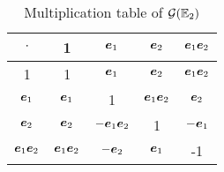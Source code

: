 \begin{table}[h!]
	\centering
	\begin{tabular}{|c|c|c|c|c|}
		\hline
		$\cdot$ & 1 & $\boldsymbol{e}_1$ & $\boldsymbol{e}_2$ & $\boldsymbol{e}_1\boldsymbol{e}_2$ \\
		\hline
		1 & 1 & $\boldsymbol{e}_1$ & $\boldsymbol{e}_2$ & $\boldsymbol{e}_1\boldsymbol{e}_2$ \\
		\hline
		$\boldsymbol{e}_1$ & $\boldsymbol{e}_1$ & 1 & $\boldsymbol{e}_1\boldsymbol{e}_2$ & $\boldsymbol{e}_2$ \\
		\hline
		$\boldsymbol{e}_2$ & $\boldsymbol{e}_2$ & $-\boldsymbol{e}_1\boldsymbol{e}_2$ & 1 & $-\boldsymbol{e}_1$ \\
		\hline
		$\boldsymbol{e}_1\boldsymbol{e}_2$ & $\boldsymbol{e}_1\boldsymbol{e}_2$ & $-\boldsymbol{e}_2$ & $\boldsymbol{e}_1$ & -1 \\
		\hline
	\end{tabular}
	\caption{Multiplication table of $\mathcal{G}(\mathbb{E}_2)$}
	\label{ta:mt2a}
\end{table}

